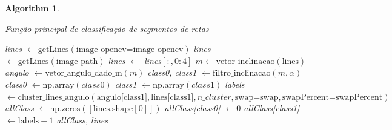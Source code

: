 \documentclass[12pt]{article}
\newtheorem{algorithm}{Algorithm}
\begin{document}
\begin{algorithm}
\begin{algorithmic}[2]
    \small \small \small \small
    \caption{Função principal de classificação de segmentos de retas}
        \State lines $\gets \text{getLines}(\text{image\_opencv=image\_opencv})$
    \Else
        \State lines $\gets \text{getLines}(\text{image\_path})$
    \EndIf
    \State lines $\gets$ lines$[:,0:4]$
    \State $m \gets \text{vetor\_inclinacao}(\text{lines})$
    \State angulo $\gets \text{vetor\_angulo\_dado\_m}(m)$
    \State class0, class1 $\gets \text{filtro\_inclinacao}(m, \alpha)$
    \State class0 $\gets \text{np.array}(class0)$
    \State class1 $\gets \text{np.array}(class1)$
    \State labels $\gets \text{cluster\_lines\_angulo}(\text{angulo[class1]}, \text{lines[class1]}, n\_cluster, \text{swap=swap}, \text{swapPercent=swapPercent})$
    \State allClass $\gets \text{np.zeros}([\text{lines.shape}[0]])$
    \State allClass[class0] $\gets 0$
    \State allClass[class1] $\gets \text{labels} + 1$
    \State \Return allClass, lines
\EndFunction

\end{algorithmic}
\end{algorithm}
\end{document}
